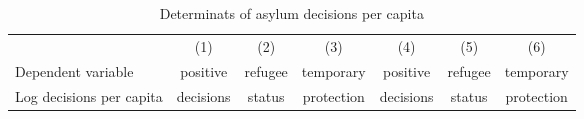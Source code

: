 \begin{table}[htbp]\centering \scriptsize
\def\sym#1{\ifmmode^{#1}\else\(^{#1}\)\fi}
\caption{Determinats of asylum decisions per capita}
\begin{tabular}{l*{6}{c}}
\hline\hline
                    &\multicolumn{1}{c}{(1)}&\multicolumn{1}{c}{(2)}&\multicolumn{1}{c}{(3)}&\multicolumn{1}{c}{(4)}&\multicolumn{1}{c}{(5)}&\multicolumn{1}{c}{(6)}  \\                 
 Dependent variable                  & \multicolumn{1}{c}{positive} & \multicolumn{1}{c}{refugee} &\multicolumn{1}{c}{temporary} & \multicolumn{1}{c}{positive} & \multicolumn{1}{c}{refugee} &\multicolumn{1}{c}{temporary}\\
                    
Log decisions per capita                     &\multicolumn{1}{c}{decisions} &\multicolumn{1}{c}{status} &\multicolumn{1}{c}{ protection} &\multicolumn{1}{c}{decisions} &\multicolumn{1}{c}{status} &\multicolumn{1}{c}{protection} \\


\end{tabular}
\end{table}
